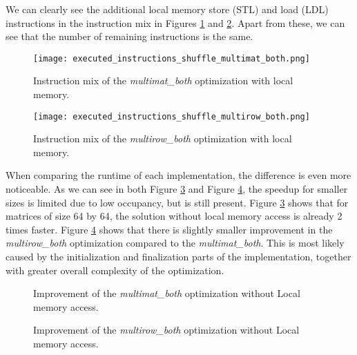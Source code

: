 We can clearly see the additional local memory store (STL) and load (LDL) instructions in the instruction mix in Figures \ref{fig:shuffle_multimat_both_instruction_mix} and \ref{fig:shuffle_multirow_both_instruction_mix}. Apart from these, we can see that the number of remaining instructions is the same.

\begin{figure}[ht]
	\centering
	\texttt{[image: executed\_instructions\_shuffle\_multimat\_both.png]}
	\caption{Instruction mix of the \textit{multimat\_both} optimization with local memory.}
	\label{fig:shuffle_multimat_both_instruction_mix}
\end{figure}


\begin{figure}[ht]
	\centering
	\texttt{[image: executed\_instructions\_shuffle\_multirow\_both.png]}
	\caption{Instruction mix of the \textit{multirow\_both} optimization with local memory.}
	\label{fig:shuffle_multirow_both_instruction_mix}
\end{figure}



When comparing the runtime of each implementation, the difference is even more noticeable. As we can see in both Figure \ref{fig:multimat_both_speedup} and Figure \ref{fig:multirow_both_speedup}, the speedup for smaller sizes is limited due to low occupancy, but is still present. Figure \ref{fig:multimat_both_speedup} shows that for matrices of size 64 by 64, the solution without local memory access is already 2 times faster. 
Figure \ref{fig:multirow_both_speedup} shows that there is slightly smaller improvement in the \textit{multirow\_both} optimization compared to the \textit{multimat\_both}. This is most likely caused by the initialization and finalization parts of the implementation, together with greater overall complexity of the optimization.
\begin{figure}[ht]
	\centering
	\def\svgwidth{0.5\textwidth}
	
	\caption{Improvement of the \textit{multimat\_both} optimization without Local memory access.}
	\label{fig:multimat_both_speedup}
\end{figure}

\begin{figure}[ht]
	\centering
	\def\svgwidth{0.5\textwidth}
	
	\caption{Improvement of the \textit{multirow\_both} optimization without Local memory access.}
	\label{fig:multirow_both_speedup}
\end{figure}


